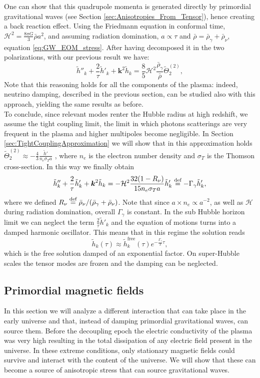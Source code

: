 One can show that this quadrupole momenta is generated directly by primordial gravitational waves (see Section \ref{sec:Anisotropies_From_Tensor}), hence creating a back reaction effect. Using the Friedmann equation in conformal time, $\mathcal{H}^2=\tfrac{8\pi G}{3}\bar\rho a^2$, and assuming radiation domination, $a\propto \tau$ and $\bar\rho=\bar\rho_\gamma+\bar\rho_\nu$, equation \eqref{eq:GW_EOM_stress}. After having decomposed it in the two polarizations, with our previous result we have:
$$
    \tilde h''_{k}+\frac{2}{\tau}\tilde h'_{k}+\boldsymbol{k}^2 \tilde h_{k}=\frac{8}{5}\mathcal{H}^2\frac{\bar\rho_\gamma}{\bar\rho}\tilde\Theta_2^{(2)},
$$
Note that this reasoning holds for all the components of the plasma: indeed, neutrino damping, described in the previous section, can be studied also with this approach, yielding the same results as before.\\
To conclude, since relevant modes renter the Hubble radius at high redshift, we assume the tight coupling limit, the limit in which photons scatterings are very frequent in the plasma and higher multipoles become negligible. In Section \ref{sec:TightCouplingApproximation} we will show that in this approximation holds $\tilde\Theta^{(2)}_2\approx-\tfrac43\tfrac{\tilde h'}{n_e\sigma_T a}$ ,
where $n_e$ is the electron number density and $\sigma_T$ is the Thomson cross-section. In this way we finally obtain 
$$
    \tilde h''_{k}+\frac{2}{\tau}\tilde h'_{k}+\boldsymbol{k}^2 \tilde h_{k}=-\mathcal{H}^2\frac{32(1-R_\nu)}{15n_e\sigma_T a}\tilde h'_{k}\stackrel{\text{def}}{=} -\Gamma_\gamma \tilde h'_k,
$$
where we defined $R_\nu\stackrel{\text{def}}{=}\bar\rho_\nu/(\bar\rho_\gamma+\bar\rho_\nu)$. Note that since $a\times n_e\propto a^{-2}$, as well as $\mathcal{H}$ during radiation domination, overall $\Gamma_\gamma$ is constant. In the sub Hubble horizon limit we can neglect the term $\tfrac2\tau \tilde h'_k$ and the equation of motions turns into a damped harmonic oscillator. This means that in this regime the solution reads 
\begin{equation}
    \tilde h_k(\tau)\approx\tilde h_k^{\text{free}}(\tau)e^{-\frac{\Gamma_\gamma}{2}\tau},
\end{equation} 
which is the free solution damped of an exponential factor. On super-Hubble scales the tensor modes are frozen and the damping can be neglected.
\subsection{Primordial magnetic fields}
In this section we will analyze a different interaction that can take place in the early universe and that, instead of damping primordial gravitational waves, can source them. Before the decoupling epoch the electric conductivity of the plasma was very high resulting in the total dissipation of any electric field present in the universe. In these extreme conditions, only stationary magnetic fields could survive and interact with the content of the universe. We will show that these can become a source of anisotropic stress that can source gravitational waves.

